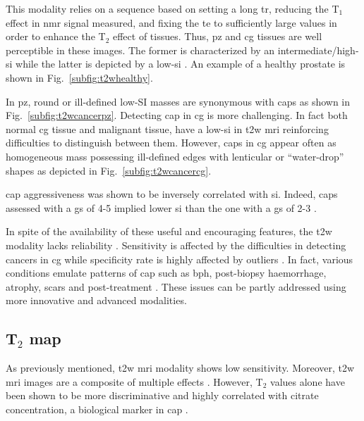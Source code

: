 This modality relies on a sequence based on setting a long \ac{tr}, reducing the T$_{1}$ effect in \ac{nmr} signal measured, and fixing the \ac{te} to sufficiently large values in order to enhance the T$_{2}$ effect of tissues.
Thus, \ac{pz} and \ac{cg} tissues are well perceptible in these images.
The former is characterized by an intermediate/high-\ac{si} while the latter is depicted by a low-\ac{si} \cite{Hricak1987}.
An example of a healthy prostate is shown in Fig.~\ref{subfig:t2whealthy}.

In \ac{pz}, round or ill-defined low-SI masses are synonymous with \acp{cap} \cite{Hricak1983} as shown in Fig.~\ref{subfig:t2wcancerpz}.
Detecting \ac{cap} in \ac{cg} is more challenging.
In fact both normal \ac{cg} tissue and malignant tissue, have a low-\ac{si} in \ac{t2w} \ac{mri} reinforcing difficulties to distinguish between them.
However, \acp{cap} in \ac{cg} appear often as homogeneous mass possessing ill-defined edges with lenticular or ``water-drop'' shapes \cite{Akin2006, Barentsz2012} as depicted in Fig.~\ref{subfig:t2wcancercg}. 

\ac{cap} aggressiveness was shown to be inversely correlated with \ac{si}.
Indeed, \acp{cap} assessed with a \ac{gs} of 4-5 implied lower \ac{si} than the one with a \ac{gs} of 2-3 \cite{Wang2008}.

In spite of the availability of these useful and encouraging features, the \ac{t2w} modality lacks reliability \cite{Kirkham2006,Hoeks2011}.
Sensitivity is affected by the difficulties in detecting cancers in \ac{cg} \cite{Kirkham2006} while specificity rate is highly affected by outliers \cite{Barentsz2012}.
In fact, various conditions emulate patterns of \ac{cap} such as \ac{bph}, post-biopsy haemorrhage, atrophy, scars and post-treatment \cite{Hricak1987,Quint1991,Scheidler1999,Cruz2002,Barentsz2012}.
These issues can be partly addressed using more innovative and advanced modalities.

\subsection{T$_2$ map} \label{subsec:chp2:imaging:t2}
As previously mentioned, \ac{t2w} \ac{mri} modality shows low sensitivity.
Moreover, \ac{t2w} \ac{mri} images are a composite of multiple effects \cite{Hegde2013}.
However, T$_2$ values alone have been shown to be more discriminative \cite{Liu2011} and highly correlated with citrate concentration, a biological marker in \ac{cap} \cite{Liney1996,Liney1997}. 

